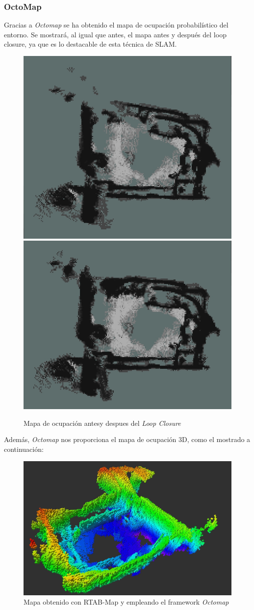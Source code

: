 \subsubsection{OctoMap}
Gracias a \textit{Octomap} se ha obtenido el mapa de ocupación probabilístico del entorno. Se mostrará, al igual que antes, el mapa antes y después del loop closure, ya que es lo
destacable de esta técnica de SLAM.
\begin{figure}[h!]
    \centering
    \includegraphics[width=.4\textwidth]{images/slam/bag1_occupGrid_noLC}
    \includegraphics[width=.435\textwidth]{images/slam/bag1_occupGrid_LC}
    \caption{Mapa de ocupación antesy despues del \textit{Loop Closure}}
\end{figure}

Además, \textit{Octomap} nos proporciona el mapa de ocupación 3D, como el mostrado a continuación:
\begin{figure}[h!]
    \centering
    \includegraphics[width=.9\textwidth]{images/slam/bag1_octomap_LC}
    \caption{Mapa obtenido con RTAB-Map y empleando el framework \textit{Octomap}}
\end{figure}

